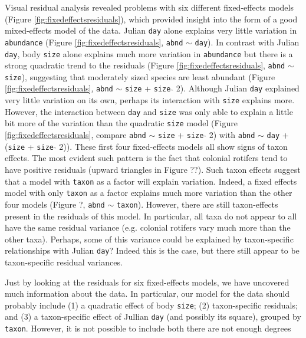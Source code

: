 \documentclass[12pt]{ecology}
\begin{document}
Visual residual analysis revealed problems with six different fixed-effects models (Figure \ref{fig:fixedeffectsresiduals}), which provided insight into the form of a good mixed-effects model of the data.  Julian \texttt{day} alone explains very little variation in \texttt{abundance} (Figure \ref{fig:fixedeffectsresiduals}, \texttt{abnd} $\sim$ \texttt{day}).  In contrast with Julian \texttt{day}, body \texttt{size} alone explains much more variation in \texttt{abundance} but there is a strong quadratic trend to the residuals (Figure \ref{fig:fixedeffectsresiduals}, \texttt{abnd} $\sim$ \texttt{size}), suggesting that moderately sized species are least abundant (Figure \ref{fig:fixedeffectsresiduals}, \texttt{abnd} $\sim$ \texttt{size} + \texttt{size} $\hat{}$ 2).  Although Julian \texttt{day} explained very little variation on its own, perhaps its interaction with \texttt{size} explains more.  However, the interaction between \texttt{day} and \texttt{size} was only able to explain a little bit more of the variation than the quadratic \texttt{size} model (Figure \ref{fig:fixedeffectsresiduals}, compare \texttt{abnd} $\sim$ \texttt{size} + \texttt{size} $\hat{}$ 2) with \texttt{abnd} $\sim$ \texttt{day} + (\texttt{size} + \texttt{size} $\hat{}$ 2)).  These first four fixed-effects models all show signs of taxon effects.  The most evident such pattern is the fact that colonial rotifers tend to have positive residuals (upward triangles in Figure ??).  Such taxon effects suggest that a model with \texttt{taxon} as a factor will explain variation.  Indeed, a fixed effects model with only \texttt{taxon} as a factor explains much more variation than the other four models (Figure ?, \texttt{abnd} $\sim$ \texttt{taxon}).  However, there are still taxon-effects present in the residuals of this model.  In particular, all taxa do not appear to all have the same residual variance (e.g. colonial rotifers vary much more than the other taxa).  Perhaps, some of this variance could be explained by taxon-specific relationships with Julian \texttt{day}?  Indeed this is the case, but there still appear to be taxon-specific residual variances.

Just by looking at the residuals for six fixed-effects models, we have uncovered much information about the data.  In particular, our model for the data should probably include (1) a quadratic effect of body \texttt{size}; (2) taxon-specific residuals; and (3) a taxon-specific effect of Jullian \texttt{day} (and possibly its square), grouped by \texttt{taxon}.  However, it is not possible to include both     there are not enough degrees 
\end{document}
